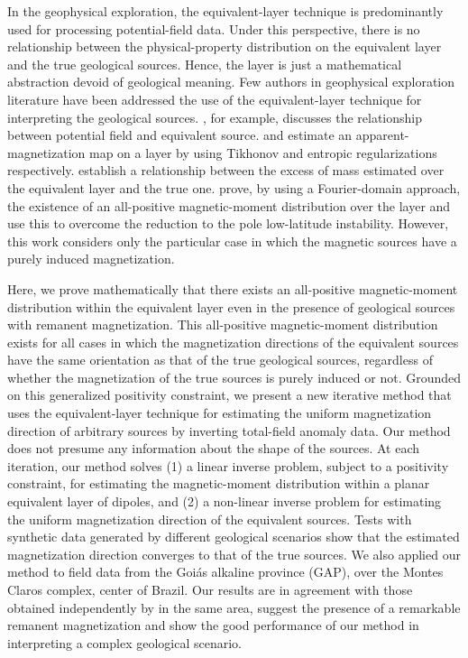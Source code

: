 In the geophysical exploration, the equivalent-layer technique is predominantly used for processing potential-field data. 
Under this perspective, there is no relationship between the physical-property distribution on the equivalent layer 
and the true geological sources. Hence, the layer is just a mathematical abstraction devoid of geological meaning. 
Few authors in geophysical exploration literature have been addressed the use of the equivalent-layer technique for interpreting
the geological sources. \cite{pedersen1991}, for example, discusses the relationship between potential field and equivalent source. 
\cite{medeiros_silva1996} and \cite{silva-etal2010} estimate an apparent-magnetization map on a layer by using Tikhonov and 
entropic regularizations respectively. \cite{siqueira_etal_2017} establish a relationship between the excess of mass estimated 
over the equivalent layer and the true one. \cite{li_etal_2014} prove, by using a Fourier-domain  approach, 
the existence of an all-positive magnetic-moment distribution over the layer and use this to overcome the reduction to the pole low-latitude instability. 
However, this work considers only the particular case in which the magnetic sources have a purely induced magnetization.

Here, we prove mathematically that there exists an all-positive magnetic-moment 
distribution within the equivalent layer even in the 
presence of geological sources with remanent magnetization. This all-positive 
magnetic-moment distribution exists for 
all cases in which the magnetization directions of the equivalent sources have the 
same orientation as that of the true geological sources, 
regardless of whether the magnetization of the true sources is purely induced 
or not. Grounded on this generalized positivity constraint, 
we present a new iterative method that uses the equivalent-layer technique 
for estimating the uniform magnetization direction of 
arbitrary sources by inverting total-field anomaly data. Our method does not 
presume any information about the shape of the sources. 
At each iteration, our method solves (1) a linear inverse problem, subject to 
a positivity constraint, for estimating the magnetic-moment 
distribution within a planar equivalent layer of dipoles, and (2) a 
non-linear inverse problem for estimating the uniform magnetization 
direction of the equivalent sources. Tests with synthetic data generated 
by different geological scenarios show that the estimated magnetization
direction converges to that of the true sources. We also applied our method to 
field data from the Goi{\' a}s alkaline province (GAP), 
over the Montes Claros complex, center of Brazil. Our results are in agreement 
with those obtained independently by \cite{zhang_etal_2018} 
in the same area, suggest the presence of a remarkable remanent magnetization 
and show the good performance of our method in interpreting 
a complex geological scenario.
